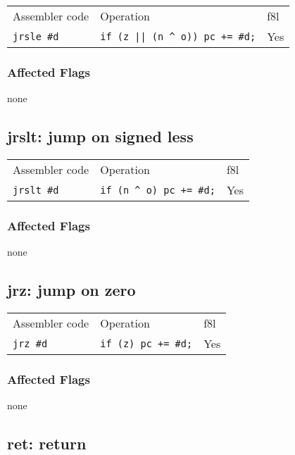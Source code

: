 \documentclass{book}
\begin{document}
\begin{tabular}{l l l}
Assembler code   & Operation                  & f8l \\
\texttt{jrsle \#d} & \texttt{if (z || (n \^{} o)) pc += \#d;} & Yes \\
\end{tabular}

\subsubsection*{Affected Flags}

none


\subsection{jrslt: jump on signed less}

\begin{tabular}{l l l}
Assembler code     & Operation                         & f8l \\
\texttt{jrslt \#d} & \texttt{if (n \^{} o) pc += \#d;} & Yes \\
\end{tabular}

\subsubsection*{Affected Flags}

none


\subsection{jrz: jump on zero}

\begin{tabular}{l l l}
Assembler code   & Operation                  & f8l \\
\texttt{jrz \#d} & \texttt{if (z) pc += \#d;} & Yes \\
\end{tabular}

\subsubsection*{Affected Flags}

none


\subsection{ret: return}
\end{document}
